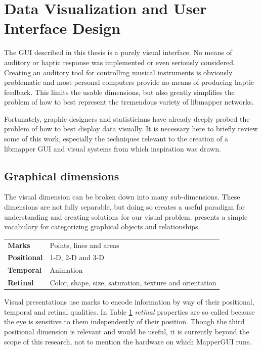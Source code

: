 \section{Data Visualization and User Interface Design}
\label{sec:data_viz}

The GUI described in this thesis is a purely visual interface. No means of auditory or haptic response was implemented or even seriously considered. Creating an auditory tool for controlling musical instruments is obviously problematic and most personal computers provide no means of producing haptic feedback. This limits the usable dimensions, but also greatly simplifies the problem of how to best represent the tremendous variety of libmapper networks.

Fortunately, graphic designers and statisticians have already deeply probed the problem of how to best display data visually. It is necessary here to briefly review some of this work, especially the techniques relevant to the creation of a libmapper GUI and visual systems from which inspiration was drawn.

\subsection{Graphical dimensions}

The visual dimension can be broken down into many sub-dimensions. These dimensions are not fully separable, but doing so creates a useful paradigm for understanding and creating solutions for our visual problem.  presents a simple vocabulary for categorizing graphical objects and relationships.

\begin{table}
	\centering
	\label{tab:graphical_relationships}
		\begin{tabular}{l  l}
		\hline\hline
		\textbf{Marks}& Points, lines and areas\\
		\textbf{Positional}& 1-D, 2-D and 3-D\\
		\textbf{Temporal}& Animation\\
		\textbf{Retinal}& Color, shape, size, saturation, texture and orientation\\
		\hline
		\end{tabular}
\end{table}


Visual presentations use marks to encode information by way of their positional, temporal and retinal qualities. In Table \ref{tab:graphical_relationships} \emph{retinal} properties are so called because the eye is sensitive to them independently of their position. Though the third positional dimension is relevant and would be useful, it is currently beyond the scope of this research, not to mention the hardware on which MapperGUI runs. 

